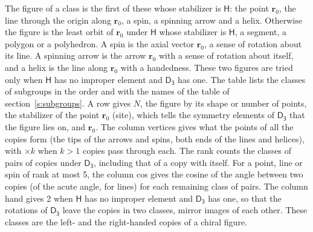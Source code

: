 \documentclass[10pt,a4paper]{article}
\numberwithin{equation}{section}
\newcommand{\grp}[1]{\mathsf{#1}}
\newcommand{\pointr}{\mathbf{r}}
\begin{document}
\leavevmode\label{n:head.figure}The figure of a class is the first of these whose stabilizer is $\grp{H}$: the point $\pointr_0$, the line through the origin along $\pointr_0$, a spin, a spinning arrow and a helix. Otherwise the figure is the least orbit of $\pointr_0$ under $\grp{H}$ whose stabilizer is $\grp{H}$, a segment, a polygon or a polyhedron. A spin is the axial vector $\pointr_0$, a sense of rotation about its line. A spinning arrow is the arrow $\pointr_0$ with a sense of rotation about itself, and a helix is the line along $\pointr_0$ with a handedness. These two figures are tried only when $\grp{H}$ has no improper element and $\grp{D_{3}}$ has one. The table lists the classes of subgroups in the order and with the names of the table of section~\ref{s:subgroups}. \label{n:head.site}A row gives $N$, the figure by its shape or number of points, the stabilizer of the point $\pointr_0$ (site), which tells the symmetry elements of $\grp{D_{3}}$ that the figure lies on, and $\pointr_0$. \label{n:head.vertices}The column vertices gives what the points of all the copies form (the tips of the arrows and spins, both ends of the lines and helices), with ${\times}k$ when $k > 1$ copies pass through each. \label{n:head.rank}The rank counts the classes of pairs of copies under $\grp{D_{3}}$, including that of a copy with itself. \label{n:head.cos}For a point, line or spin of rank at most 5, the column cos gives the cosine of the angle between two copies (of the acute angle, for lines) for each remaining class of pairs. \label{n:head.hand}The column hand gives 2 when $\grp{H}$ has no improper element and $\grp{D_{3}}$ has one, so that the rotations of $\grp{D_{3}}$ leave the copies in two classes, mirror images of each other. These classes are the left- and the right-handed copies of a chiral figure.
\end{document}
